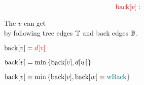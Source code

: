 \begin{frame}{}
  \[
    \textcolor{red}{\text{back}[v]:}
  \]

  \begin{center}
    The  $v$ can get \\[6pt]
    by following tree edges $\mathbb{T}$ and back edges $\mathbb{B}$.
  \end{center}
\end{frame}


\begin{frame}{}
  \begin{description}
    \item[tree edge ($\to v$):]   $\text{back}[v] = \textcolor{red}{d[v]}$
    \item[back edge ($v \to w$):] $\text{back}[v] = \min \left\{\text{back}[v], d[w]\right\}$
    \item[backtracking from $w$:] $\text{back}[v] = \min \left\{\text{back}[v], \text{back}[w] = \textcolor{teal}{\text{wBack}}\right\}$
  \end{description}
\end{frame}
\begin{frame}{}
\end{frame}
